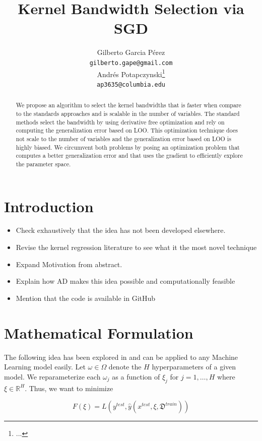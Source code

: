 \documentclass{article}
\title{Kernel Bandwidth Selection via SGD}
\author{%
  Gilberto Garcia P\'{e}rez \\
  \texttt{gilberto.gape@gmail.com} \\
  \And
  Andr\'{e}s Potapczynski\thanks{...} \\
  \texttt{ap3635@columbia.edu}
}
\begin{document}
\maketitle

\begin{abstract}
  We propose an algorithm to select the kernel bandwidths that is faster when compare
  to the standards approaches and is scalable in the number of variables. The standard
  methods select the bandwidth by using derivative free optimization and rely
  on computing the generalization error based on LOO. This optimization technique does
  not scale to the number of variables and the generalization error based on LOO
  is highly biased. We circumvent both problems by posing an optimization problem
  that computes a better generalization error and that uses the gradient to efficiently
  explore the parameter space.

\end{abstract}

\section{Introduction}

\begin{itemize}
  \item Check exhaustively that the idea has not been developed elsewhere.
  \item Revise the kernel regression literature to see what it the most novel technique
  \item Expand Motivation from abstract.
  \item Explain how AD makes this idea possible and computationally feasible \citet{AD}
  \item Mention that the code is available in GitHub
\end{itemize}

\section{Mathematical Formulation}

The following idea has been explored in \citet{hyperopt} and can be applied to
any Machine Learning model easily. Let $\omega \in \Omega$ denote the $H$
hyperparameters of a given model. We reparameterize each $\omega_j$ as a function of $\xi_j$
for $j=1,\dots,H$ where $\xi \in \mathbb{R}^H$. Thus, we want to minimize

$$F(\xi)=L( y^{test}, \hat{y}(x^{test}, \xi, \mathfrak{D}^{train}) )$$
\end{document}
